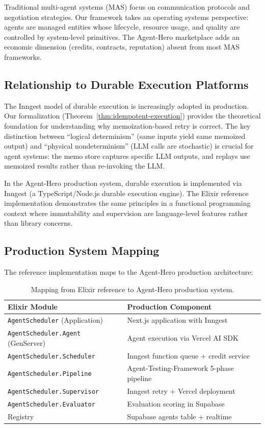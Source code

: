 \documentclass[12pt,a4paper]{article}
\theoremstyle{definition}
\theoremstyle{remark}
\begin{document}
Traditional multi-agent systems (MAS) \citep{wooldridge2009introduction,dorri2018multi} focus on communication protocols and negotiation strategies. Our framework takes an operating systems perspective: agents are managed entities whose lifecycle, resource usage, and quality are controlled by system-level primitives. The Agent-Hero marketplace adds an economic dimension (credits, contracts, reputation) absent from most MAS frameworks.

\subsection{Relationship to Durable Execution Platforms}

The Inngest model of durable execution \citep{inngest2024} is increasingly adopted in production. Our formalization (Theorem~\ref{thm:idempotent-execution}) provides the theoretical foundation for understanding why memoization-based retry is correct. The key distinction between ``logical determinism'' (same inputs yield same memoized output) and ``physical nondeterminism'' (LLM calls are stochastic) is crucial for agent systems: the memo store captures specific LLM outputs, and replays use memoized results rather than re-invoking the LLM.

In the Agent-Hero production system, durable execution is implemented via Inngest (a TypeScript/Node.js durable execution engine). The Elixir reference implementation demonstrates the same principles in a functional programming context where immutability and supervision are language-level features rather than library concerns.

\subsection{Production System Mapping}

The reference implementation maps to the Agent-Hero production architecture:

\begin{table}[H]
\centering
\small
\begin{tabular}{@{}ll@{}}
\toprule
\textbf{Elixir Module} & \textbf{Production Component} \\
\midrule
\texttt{AgentScheduler} (Application) & Next.js application with Inngest \\
\texttt{AgentScheduler.Agent} (GenServer) & Agent execution via Vercel AI SDK \\
\texttt{AgentScheduler.Scheduler} & Inngest function queue + credit service \\
\texttt{AgentScheduler.Pipeline} & Agent-Testing-Framework 5-phase pipeline \\
\texttt{AgentScheduler.Supervisor} & Inngest retry + Vercel deployment \\
\texttt{AgentScheduler.Evaluator} & Evaluation scoring in Supabase \\
Registry & Supabase agents table + realtime \\
\bottomrule
\end{tabular}
\caption{Mapping from Elixir reference to Agent-Hero production system.}\label{tab:production-mapping}
\end{table}
\end{document}
